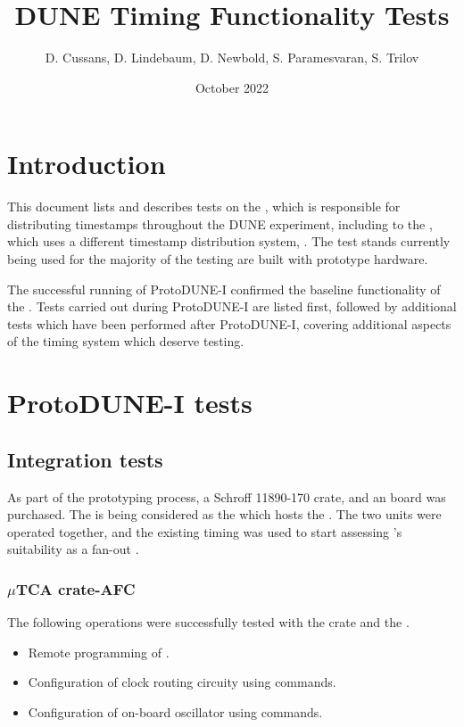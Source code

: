\documentclass{dune}
\title{DUNE Timing Functionality Tests}
\author{D. Cussans, D. Lindebaum, D. Newbold, S. Paramesvaran, S. Trilov}
\date{October 2022}
\begin{document}
\linenumbers
\maketitle

\tableofcontents


\section{Introduction}
This document lists and describes tests on the , which is responsible for distributing timestamps throughout the DUNE experiment, including to the  , which uses a different timestamp distribution system, .
The test stands currently being used for the majority of the testing are built with prototype hardware.

The successful running of ProtoDUNE-I confirmed the baseline functionality of the .
Tests carried out during ProtoDUNE-I are listed first, followed by additional tests which have been performed after ProtoDUNE-I, covering additional aspects of the timing system which deserve testing.

\section{ProtoDUNE-I tests}
\subsection{Integration tests}
As part of the  prototyping process, a Schroff 11890-170  crate, and an  board \cite{amc_ohwr} was purchased.
The  is being considered as the  which hosts the .
The two units were operated together, and the existing timing  was used to start assessing ’s suitability as a fan-out .

\subsubsection{$\mu$TCA crate-AFC}
The following operations were successfully tested with the  crate and the .
\begin{itemize}
    \item Remote programming of  .
    \item Configuration of  clock routing circuity using  commands.
    \item Configuration of  on-board oscillator using  commands.
\end{itemize}
\end{document}
